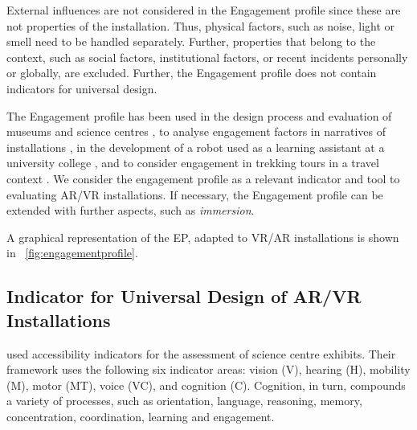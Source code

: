 \documentclass[11pt,english]{nik}
\newcommand{\EP}{Engagement profile\xspace}
\newcommand{\ep}{engagement profile\xspace}
\begin{document}
External influences are not considered in the \EP
since these are not properties of the installation. Thus, physical
factors, such as noise, light or smell need to be handled
separately. Further, properties that belong to the context,
such as social factors, institutional factors, or recent incidents
personally or globally, are excluded. 
Further, the \EP does not contain indicators for universal design.

The \EP has been used in the design process and evaluation of museums and science centres
\autocite{aDesignProcess}, to analyse engagement factors in narratives of installations
\autocite{jMuseum2018,jLearningTrails2019}, in the development of a robot used as a 
learning assistant at a university college \autocite{jRobot2019}, and to consider engagement 
in trekking tours in a travel context \autocite{jTrekking2019}.
%
We consider the \ep as a relevant indicator and tool to evaluating AR/VR installations.
If necessary, the \EP can be extended with further aspects, such as \emph{immersion}. 

A graphical representation of the EP, adapted to VR/AR installations is shown in 
\figurename~\ref{fig:engagementprofile}.
%
%


\subsection{Indicator for Universal Design of AR/VR Installations}





\citet{10.1007/978-3-030-29381-9-3} used accessibility indicators for
the assessment of science centre exhibits.
Their framework uses the following six indicator areas:
   vision (V), 
   hearing (H), 
   mobility (M), 
   motor (MT), 
   voice (VC), 
and 
   cognition (C).
Cognition, in turn, compounds a variety of processes, such as
orientation, language, reasoning, memory, concentration, coordination,
learning and engagement.
\end{document}
